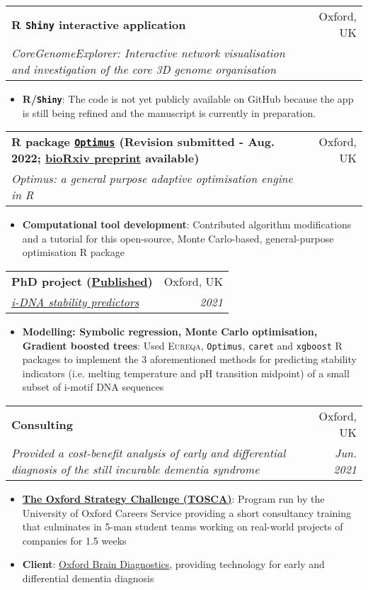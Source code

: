 \documentclass[legalpaper,11pt]{article}
\makeatletter
\newcommand{\resumeItem}[2]{
  \item\small{
    \textbf{#1}{: #2 \vspace{-2pt}}
  }
}
\newcommand{\resumeSubheading}[4]{
  \vspace{-1pt}\item
    \begin{tabular*}{0.97\textwidth}[t]{l@{\extracolsep{\fill}}r}
      \textbf{#1} & #2 \\
      \textit{\small#3} & \textit{\small #4} \\
    \end{tabular*}\vspace{-5pt}
}
\newcommand{\resumeItemListStart}{\begin{itemize}}
\newcommand{\resumeItemListEnd}{\end{itemize}\vspace{-5pt}}
\makeatother
\begin{document}
     \resumeSubheading
      {R \texttt{Shiny} interactive application}{Oxford, UK}
      {CoreGenomeExplorer: Interactive network visualisation and investigation of the core 3D genome organisation}{}
      \resumeItemListStart
        \resumeItem{R/\texttt{Shiny}}
          {The code is not yet publicly available on GitHub because the app is still being refined and the manuscript is currently in preparation.}
     \resumeItemListEnd

     \resumeSubheading
      {R package \href{https://github.com/SahakyanLab/Optimus}{\texttt{Optimus}} (Revision submitted - Aug. 2022; \href{https://www.biorxiv.org/content/10.1101/2022.01.18.476810v1}{bioRxiv preprint} available)}{Oxford, UK}
      {Optimus: a general purpose adaptive optimisation engine in R}{}
      \resumeItemListStart
        \resumeItem{Computational tool development}
          {Contributed algorithm modifications and a tutorial for this open-source, Monte Carlo-based, general-purpose optimisation R package}
     \resumeItemListEnd
     
     \resumeSubheading
      {PhD project (\href{https://doi.org/10.1002/anie.202016801}{Published})}{Oxford, UK}
      {\href{https://github.com/SahakyanLab/iMotif_dev}{i-DNA stability predictors}}{2021}
      \resumeItemListStart
        \resumeItem{Modelling: Symbolic regression, Monte Carlo optimisation, Gradient boosted trees}
          {Used \textsc{Eureqa}, \texttt{Optimus}, \texttt{caret} and \texttt{xgboost} R packages to implement the 3 aforementioned methods for predicting stability indicators (i.e. melting temperature and pH transition midpoint) of a small subset of i-motif DNA sequences}
     \resumeItemListEnd

     \resumeSubheading
      {Consulting}{Oxford, UK}
      {Provided a cost-benefit analysis of early and differential diagnosis of the still incurable dementia syndrome}{Jun. 2021}
      \resumeItemListStart
        \resumeItem{\href{https://www.careers.ox.ac.uk/oxford-strategy-challenge}{The Oxford Strategy Challenge (TOSCA)}}
          {Program run by the University of Oxford Careers Service providing a short consultancy training that culminates in 5-man student teams working on real-world projects of companies for 1.5 weeks}
        \resumeItem{Client}
          {\href{https://www.oxfordbraindiagnostics.com/}{Oxford Brain Diagnostics}, providing technology for early and differential dementia diagnosis}
      \resumeItemListEnd

     \newpage
     
\end{document}
